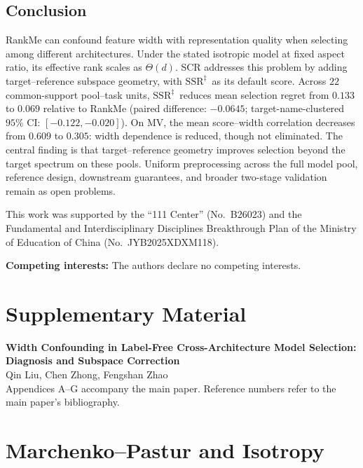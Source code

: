 \documentclass{article}
\newcommand{\SSRdag}{\ensuremath{\mathrm{SSR}^{\ddagger}}\xspace}
\begin{document}
\begin{samepage}
\section{Conclusion}

RankMe can confound feature width with representation quality when selecting among different architectures. Under the stated isotropic model at fixed aspect ratio, its effective rank scales as $\Theta(d)$. SCR addresses this problem by adding target--reference subspace geometry, with \SSRdag\ as its default score. Across $22$ common-support pool--task units, \SSRdag\ reduces mean selection regret from $0.133$ to $0.069$ relative to RankMe (paired difference: $-0.0645$; target-name-clustered $95\%$ CI: $[-0.122,-0.020]$). On MV, the mean score--width correlation decreases from $0.609$ to $0.305$: width dependence is reduced, though not eliminated. The central finding is that target--reference geometry improves selection beyond the target spectrum on these pools. Uniform preprocessing across the full model pool, reference design, downstream guarantees, and broader two-stage validation remain as open problems.\label{page:content_end}\par
\end{samepage}

\clearpage
\begin{ack}
This work was supported by the ``111 Center'' (No.~B26023) and the Fundamental and Interdisciplinary Disciplines Breakthrough Plan of the Ministry of Education of China (No.~JYB2025XDXM118).

\noindent\textbf{Competing interests:} The authors declare no competing interests.
\end{ack}




\clearpage
\appendix
\renewcommand{\thepage}{S\arabic{page}}
\setcounter{page}{1}
\section*{Supplementary Material}
\noindent\textbf{Width Confounding in Label-Free Cross-Architecture Model Selection: Diagnosis and Subspace Correction}\\
Qin Liu, Chen Zhong, Fengshan Zhao\\
Appendices A--G accompany the main paper. Reference numbers refer to the main paper's bibliography.

\section{Marchenko--Pastur and Isotropy}
\label{app:theory}
\end{document}
